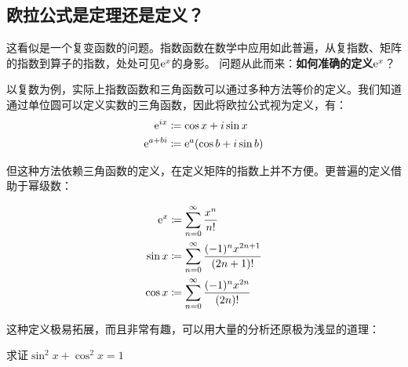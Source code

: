 \subsection{欧拉公式是定理还是定义？}

这看似是一个复变函数的问题。指数函数在数学中应用如此普遍，从复指数、矩阵的指数到算子的指数，处处可见\(\mathrm{e}^{x} \)的身影。
问题从此而来：\textbf{如何准确的定义\(\mathrm{e}^{x} \)}？

以复数为例，实际上指数函数和三角函数可以通过多种方法等价的定义。我们知道通过单位圆可以定义实数的三角函数，因此将欧拉公式视为定义，有：
\begin{align*}
    \mathrm{e}^{ix} &\coloneqq \cos x + i \sin x \\
    \mathrm{e}^{a+bi} &\coloneqq \mathrm{e}^{a} (\cos b + i \sin b)
\end{align*}

但这种方法依赖三角函数的定义，在定义矩阵的指数上并不方便。更普遍的定义借助于幂级数：

\begin{align*}
    \mathrm{e}^{x} &\coloneqq  \sum_{n=0}^{\infty} \frac{x^{n}}{n!} \\
    \sin x &\coloneqq \sum_{n=0}^{\infty} \frac{(-1)^{n} x^{2n+1}}{(2n+1)!} \\
    \cos x &\coloneqq \sum_{n=0}^{\infty} \frac{(-1)^{n} x^{2n}}{(2n)!}
\end{align*}

这种定义极易拓展，而且非常有趣，可以用大量的分析还原极为浅显的道理：

\begin{problem}
    求证\(\sin^2 x + \cos^2 x = 1\)
\end{problem}

